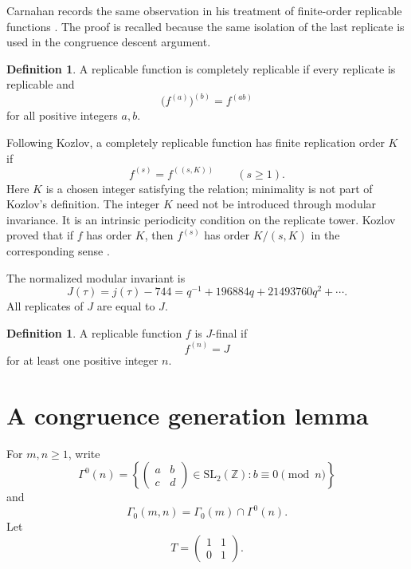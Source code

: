 \documentclass[12pt]{amsart}
\theoremstyle{definition}
\newtheorem{defn}[thm]{Definition}
\theoremstyle{remark}
\numberwithin{equation}{section}
\newcommand{\Z}{\mathbb Z}
\begin{document}
Carnahan records the same observation in his treatment of finite-order replicable functions \cite[Section~5]{carnahan}. The proof is recalled because the same isolation of the last replicate is used in the congruence descent argument.

\begin{defn}\label{def:complete}
A replicable function is completely replicable if every replicate is replicable and
\begin{equation}\label{eq:complete-composition}
\bigl(f^{(a)}\bigr)^{(b)}=f^{(ab)}
\end{equation}
for all positive integers $a,b$.
\end{defn}

Following Kozlov, a completely replicable function has finite replication order $K$ if
\begin{equation}\label{eq:finite-order}
f^{(s)}=f^{((s,K))}
\qquad(s\geq1).
\end{equation}
Here $K$ is a chosen integer satisfying the relation; minimality is not part of Kozlov's definition. The integer $K$ need not be introduced through modular invariance. It is an intrinsic periodicity condition on the replicate tower. Kozlov proved that if $f$ has order $K$, then $f^{(s)}$ has order $K/(s,K)$ in the corresponding sense \cite{kozlov}.

The normalized modular invariant is
\begin{equation}\label{eq:J}
J(\tau)=j(\tau)-744=q^{-1}+196884q+21493760q^2+\cdots.
\end{equation}
All replicates of $J$ are equal to $J$.

\begin{defn}\label{def:J-final}
A replicable function $f$ is $J$-final if
\[
f^{(n)}=J
\]
for at least one positive integer $n$.
\end{defn}

\section{A congruence generation lemma}

For $m,n\geq1$, write
\[
\Gamma^0(n)=
\left\{
\begin{pmatrix}a&b\\c&d\end{pmatrix}\in\mathrm{SL}_2(\Z):
 b\equiv0\pmod n
\right\}
\]
and
\[
\Gamma_0(m,n)=\Gamma_0(m)\cap\Gamma^0(n).
\]
Let
\[
T=\begin{pmatrix}1&1\\0&1\end{pmatrix}.
\]
\end{document}
